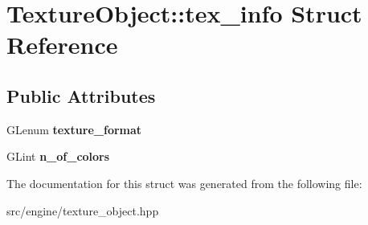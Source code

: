 \hypertarget{structTextureObject_1_1tex__info}{}\section{Texture\+Object\+::tex\+\_\+info Struct Reference}
\label{structTextureObject_1_1tex__info}
\subsection*{Public Attributes}
\begin{DoxyCompactItemize}
\item 
\mbox{\label{structTextureObject_1_1tex__info_a5c1bfb684ea3822044ae0f1a78763245}} 
G\+Lenum {\bfseries texture\+\_\+format}
\item 
\mbox{\label{structTextureObject_1_1tex__info_a57bcd9ce00be76d565adca807f4c30dd}} 
G\+Lint {\bfseries n\+\_\+of\+\_\+colors}
\end{DoxyCompactItemize}


The documentation for this struct was generated from the following file\+:\begin{DoxyCompactItemize}
\item 
src/engine/texture\+\_\+object.\+hpp\end{DoxyCompactItemize}
